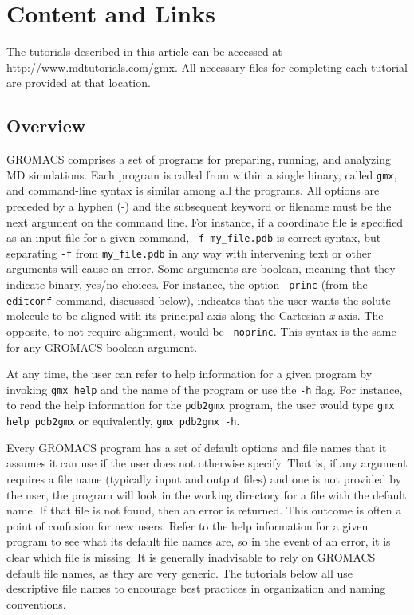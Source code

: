 \documentclass[9pt,tutorial,pubversion]{livecoms}
\newcommand{\urlstring}{http://www.mdtutorials.com/gmx}
\newcommand{\tutorialhomeurl}{\url{\urlstring}}
\begin{document}
\section{Content and Links}


The tutorials described in this article can be accessed at \tutorialhomeurl. All necessary files for completing each tutorial are provided at that location.

\subsection{Overview}

GROMACS comprises a set of programs for preparing, running, and analyzing MD simulations. Each program is called from within a single binary, called \texttt{gmx}, and command-line syntax is similar among all the programs. All options are preceded by a hyphen (-) and the subsequent keyword or filename must be the next argument on the command line. For instance, if a coordinate file is specified as an input file for a given command, \texttt{-f my\_file.pdb} is correct syntax, but separating \texttt{-f} from \texttt{my\_file.pdb} in any way with intervening text or other arguments will cause an error. Some arguments are boolean, meaning that they indicate binary, yes/no choices. For instance, the option \texttt{-princ} (from the \texttt{editconf} command, discussed below), indicates that the user wants the solute molecule to be aligned with its principal axis along the Cartesian {\em x}-axis. The opposite, to not require alignment, would be \texttt{-noprinc}. This syntax is the same for any GROMACS boolean argument.

At any time, the user can refer to help information for a given program by invoking \texttt{gmx help} and the name of the program or use the \texttt{-h} flag. For instance, to read the help information for the \texttt{pdb2gmx} program, the user would type \texttt{gmx help pdb2gmx} or equivalently, \texttt{gmx pdb2gmx -h}.

Every GROMACS program has a set of default options and file names that it assumes it can use if the user does not otherwise specify. That is, if any argument requires a file name (typically input and output files) and one is not provided by the user, the program will look in the working directory for a file with the default name. If that file is not found, then an error is returned. This outcome is often a point of confusion for new users. Refer to the help information for a given program to see what its default file names are, so in the event of an error, it is clear which file is missing. It is generally inadvisable to rely on GROMACS default file names, as they are very generic. The tutorials below all use descriptive file names to encourage best practices in organization and naming conventions.
\end{document}
